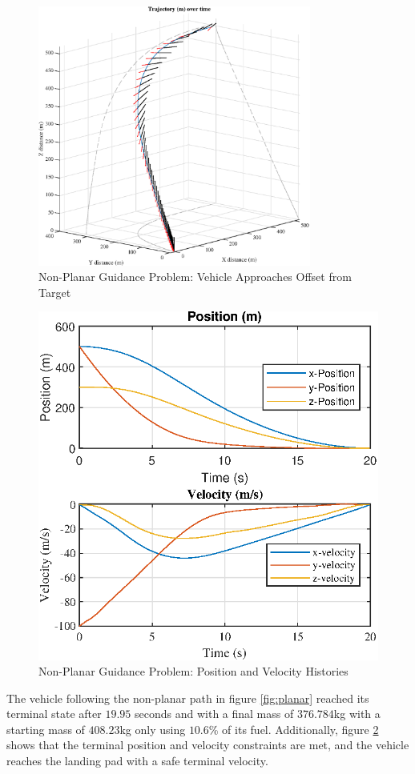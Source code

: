 \documentclass[conf]{new-aiaa}
\begin{document}
\clearpage
\begin{figure}[!htbp] 
  \centering
  \includegraphics[width=0.8\textwidth]{figs/nonplanar_3dtraj.eps}
  \caption{Non-Planar Guidance Problem: Vehicle Approaches Offset from Target}
  \label{fig:nplanar}
 \end{figure}
 
 \begin{figure}[ht] 
  \centering
  \includegraphics[width=.5\linewidth]{figs/nonplanar_rv.eps}
  \caption{Non-Planar Guidance Problem: Position and Velocity Histories}
  \label{fig:nplanar_rv}
\end{figure}

The vehicle following the non-planar path in figure \ref{fig:planar} reached its terminal state after $19.95$ seconds and with a final mass of $376.784$kg with a starting mass of $408.23$kg only using $10.6$\% of its fuel. Additionally, figure \ref{fig:nplanar_rv} shows that the terminal position and velocity constraints are met, and the vehicle reaches the landing pad with a safe terminal velocity.
\end{document}
